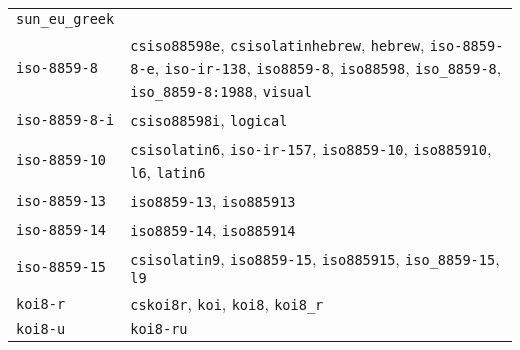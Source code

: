 \begin{longtable}[]{@{}
  >{\raggedright\arraybackslash}p{}
  >{\raggedright\arraybackslash}p{}@{}}
\texttt{\textquotesingle{}sun\_eu\_greek\textquotesingle{}} \\
\texttt{\textquotesingle{}iso-8859-8\textquotesingle{}} &
\texttt{\textquotesingle{}csiso88598e\textquotesingle{}},
\texttt{\textquotesingle{}csisolatinhebrew\textquotesingle{}},
\texttt{\textquotesingle{}hebrew\textquotesingle{}},
\texttt{\textquotesingle{}iso-8859-8-e\textquotesingle{}},
\texttt{\textquotesingle{}iso-ir-138\textquotesingle{}},
\texttt{\textquotesingle{}iso8859-8\textquotesingle{}},
\texttt{\textquotesingle{}iso88598\textquotesingle{}},
\texttt{\textquotesingle{}iso\_8859-8\textquotesingle{}},
\texttt{\textquotesingle{}iso\_8859-8:1988\textquotesingle{}},
\texttt{\textquotesingle{}visual\textquotesingle{}} \\
\texttt{\textquotesingle{}iso-8859-8-i\textquotesingle{}} &
\texttt{\textquotesingle{}csiso88598i\textquotesingle{}},
\texttt{\textquotesingle{}logical\textquotesingle{}} \\
\texttt{\textquotesingle{}iso-8859-10\textquotesingle{}} &
\texttt{\textquotesingle{}csisolatin6\textquotesingle{}},
\texttt{\textquotesingle{}iso-ir-157\textquotesingle{}},
\texttt{\textquotesingle{}iso8859-10\textquotesingle{}},
\texttt{\textquotesingle{}iso885910\textquotesingle{}},
\texttt{\textquotesingle{}l6\textquotesingle{}},
\texttt{\textquotesingle{}latin6\textquotesingle{}} \\
\texttt{\textquotesingle{}iso-8859-13\textquotesingle{}} &
\texttt{\textquotesingle{}iso8859-13\textquotesingle{}},
\texttt{\textquotesingle{}iso885913\textquotesingle{}} \\
\texttt{\textquotesingle{}iso-8859-14\textquotesingle{}} &
\texttt{\textquotesingle{}iso8859-14\textquotesingle{}},
\texttt{\textquotesingle{}iso885914\textquotesingle{}} \\
\texttt{\textquotesingle{}iso-8859-15\textquotesingle{}} &
\texttt{\textquotesingle{}csisolatin9\textquotesingle{}},
\texttt{\textquotesingle{}iso8859-15\textquotesingle{}},
\texttt{\textquotesingle{}iso885915\textquotesingle{}},
\texttt{\textquotesingle{}iso\_8859-15\textquotesingle{}},
\texttt{\textquotesingle{}l9\textquotesingle{}} \\
\texttt{\textquotesingle{}koi8-r\textquotesingle{}} &
\texttt{\textquotesingle{}cskoi8r\textquotesingle{}},
\texttt{\textquotesingle{}koi\textquotesingle{}},
\texttt{\textquotesingle{}koi8\textquotesingle{}},
\texttt{\textquotesingle{}koi8\_r\textquotesingle{}} \\
\texttt{\textquotesingle{}koi8-u\textquotesingle{}} &
\texttt{\textquotesingle{}koi8-ru\textquotesingle{}} \\

\end{longtable}
